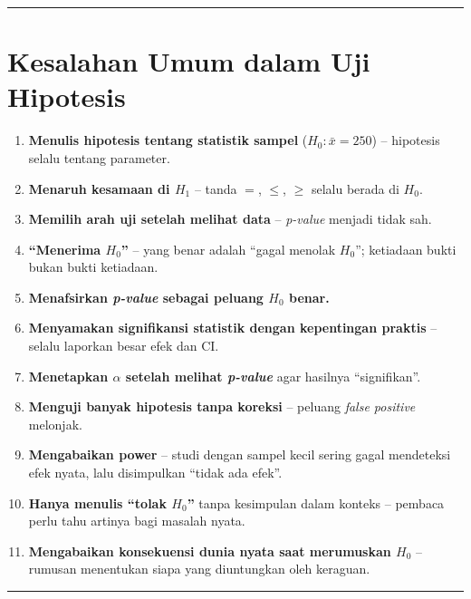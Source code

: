 \documentclass[
  indonesian,
  letterpaper,
]{book}
\providecommand{\tightlist}{%
  \setlength{\itemsep}{0pt}\setlength{\parskip}{0pt}}
\begin{document}
\begin{center}\rule{0.5\linewidth}{0.5pt}\end{center}


\chapter{Kesalahan Umum dalam Uji
Hipotesis}\label{kesalahan-umum-dalam-uji-hipotesis}

\begin{enumerate}
\def\labelenumi{\arabic{enumi}.}
\tightlist
\item
  \textbf{Menulis hipotesis tentang statistik sampel}
  (\(H_0: \bar{x} = 250\)) -- hipotesis selalu tentang parameter.
\item
  \textbf{Menaruh kesamaan di \(H_1\)} -- tanda \(=\), \(\leq\),
  \(\geq\) selalu berada di \(H_0\).
\item
  \textbf{Memilih arah uji setelah melihat data} -- \emph{p-value}
  menjadi tidak sah.
\item
  \textbf{``Menerima \(H_0\)''} -- yang benar adalah ``gagal menolak
  \(H_0\)''; ketiadaan bukti bukan bukti ketiadaan.
\item
  \textbf{Menafsirkan \emph{p-value} sebagai peluang \(H_0\) benar.}
\item
  \textbf{Menyamakan signifikansi statistik dengan kepentingan praktis}
  -- selalu laporkan besar efek dan CI.
\item
  \textbf{Menetapkan \(\alpha\) setelah melihat \emph{p-value}} agar
  hasilnya ``signifikan''.
\item
  \textbf{Menguji banyak hipotesis tanpa koreksi} -- peluang \emph{false
  positive} melonjak.
\item
  \textbf{Mengabaikan power} -- studi dengan sampel kecil sering gagal
  mendeteksi efek nyata, lalu disimpulkan ``tidak ada efek''.
\item
  \textbf{Hanya menulis ``tolak \(H_0\)''} tanpa kesimpulan dalam
  konteks -- pembaca perlu tahu artinya bagi masalah nyata.
\item
  \textbf{Mengabaikan konsekuensi dunia nyata saat merumuskan \(H_0\)}
  -- rumusan menentukan siapa yang diuntungkan oleh keraguan.
\end{enumerate}

\begin{center}\rule{0.5\linewidth}{0.5pt}\end{center}
\end{document}
